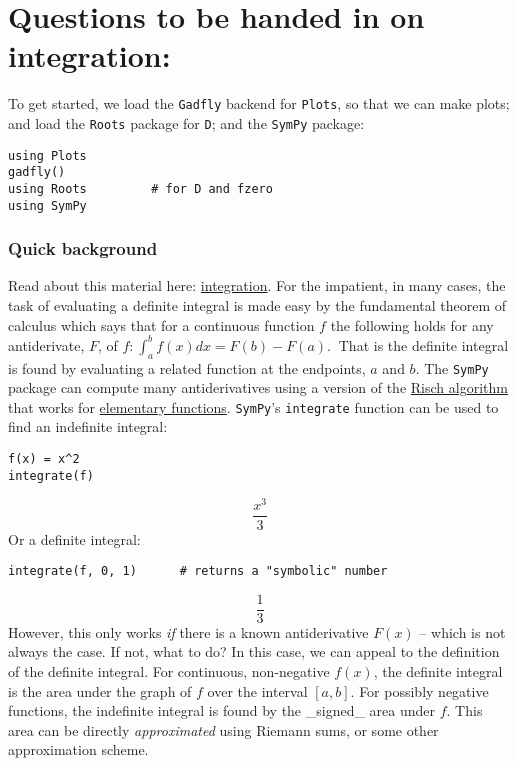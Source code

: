 \documentclass[12pt]{article}
\begin{document}
\section{Questions to be handed in on integration:}\newline
To get started, we load the \texttt{Gadfly} backend for \texttt{Plots}, so that we can make plots; and load the \texttt{Roots} package for \texttt{D}; and the \texttt{SymPy} package:\begin{verbatim}
using Plots
gadfly()
using Roots			# for D and fzero
using SymPy
\end{verbatim}
\subsubsection{Quick background}\newline
Read about this material here: \href{http://mth229.github.io/integration.html}{integration}.\newline
For the impatient, in many cases, the task of evaluating a definite integral is made easy by the fundamental theorem of calculus which says that for a continuous function $f$ the following holds for any antiderivate, $F$, of $f$:$~
\int_a^b f(x) dx = F(b) - F(a).
~$\newline
That is the definite integral is found by evaluating a related function at the endpoints, $a$ and $b$.\newline
The \texttt{SymPy} package can compute many antiderivatives using a version of the \href{http://en.wikipedia.org/wiki/Risch\_algorithm}{Risch algorithm} that works for \href{http://en.wikipedia.org/wiki/Elementary\_function}{elementary functions}. \texttt{SymPy}'s \texttt{integrate} function can be used to find an indefinite integral:\begin{verbatim}
f(x) = x^2
integrate(f)
\end{verbatim}
$$\frac{x^{3}}{3}$$\newline
Or a definite integral:\begin{verbatim}
integrate(f, 0, 1)		# returns a "symbolic" number
\end{verbatim}
$$\frac{1}{3}$$\newline
However, this only works \textit{if} there is a known antiderivative $F(x)$ – which is not always the case. If not, what to do?\newline
In this case, we can appeal to the definition of the definite integral. For continuous, non-negative $f(x)$, the definite integral is the area under the graph of $f$ over the interval $[a,b]$. For possibly negative functions, the indefinite integral is found by the _signed_ area under $f$.  This area can be directly \textit{approximated} using Riemann sums, or some other approximation scheme.\newline
\end{document}

